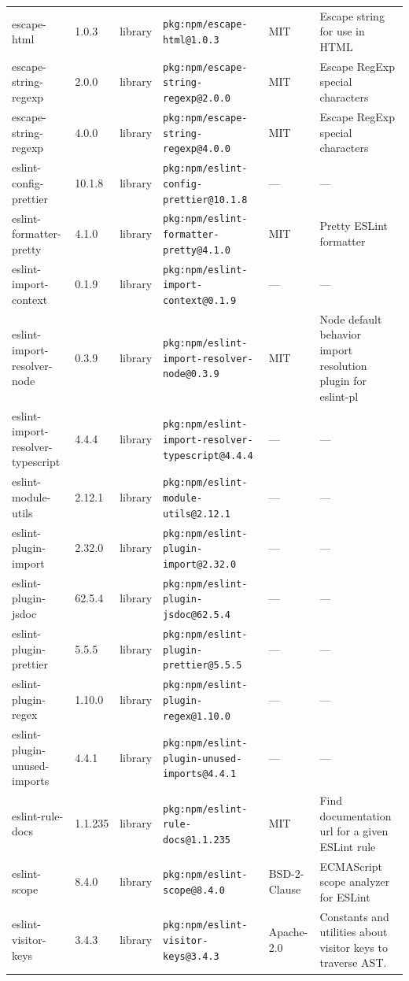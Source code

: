 \documentclass[11pt]{article}
\begin{document}
\begin{longtable}{|l|l|l|p{2.2cm}|l|p{4cm}|}
escape-html & 1.0.3 & library & \texttt{pkg:npm/escape-html@1.0.3} & MIT & Escape string for use in HTML \\
escape-string-regexp & 2.0.0 & library & \texttt{pkg:npm/escape-string-regexp@2.0.0} & MIT & Escape RegExp special characters \\
escape-string-regexp & 4.0.0 & library & \texttt{pkg:npm/escape-string-regexp@4.0.0} & MIT & Escape RegExp special characters \\
eslint-config-prettier & 10.1.8 & library & \texttt{pkg:npm/eslint-config-prettier@10.1.8} & — & — \\
eslint-formatter-pretty & 4.1.0 & library & \texttt{pkg:npm/eslint-formatter-pretty@4.1.0} & MIT & Pretty ESLint formatter \\
eslint-import-context & 0.1.9 & library & \texttt{pkg:npm/eslint-import-context@0.1.9} & — & — \\
eslint-import-resolver-node & 0.3.9 & library & \texttt{pkg:npm/eslint-import-resolver-node@0.3.9} & MIT & Node default behavior import resolution plugin for eslint-pl \\
eslint-import-resolver-typescript & 4.4.4 & library & \texttt{pkg:npm/eslint-import-resolver-typescript@4.4.4} & — & — \\
eslint-module-utils & 2.12.1 & library & \texttt{pkg:npm/eslint-module-utils@2.12.1} & — & — \\
eslint-plugin-import & 2.32.0 & library & \texttt{pkg:npm/eslint-plugin-import@2.32.0} & — & — \\
eslint-plugin-jsdoc & 62.5.4 & library & \texttt{pkg:npm/eslint-plugin-jsdoc@62.5.4} & — & — \\
eslint-plugin-prettier & 5.5.5 & library & \texttt{pkg:npm/eslint-plugin-prettier@5.5.5} & — & — \\
eslint-plugin-regex & 1.10.0 & library & \texttt{pkg:npm/eslint-plugin-regex@1.10.0} & — & — \\
eslint-plugin-unused-imports & 4.4.1 & library & \texttt{pkg:npm/eslint-plugin-unused-imports@4.4.1} & — & — \\
eslint-rule-docs & 1.1.235 & library & \texttt{pkg:npm/eslint-rule-docs@1.1.235} & MIT & Find documentation url for a given ESLint rule \\
eslint-scope & 8.4.0 & library & \texttt{pkg:npm/eslint-scope@8.4.0} & BSD-2-Clause & ECMAScript scope analyzer for ESLint \\
eslint-visitor-keys & 3.4.3 & library & \texttt{pkg:npm/eslint-visitor-keys@3.4.3} & Apache-2.0 & Constants and utilities about visitor keys to traverse AST. \\

\end{longtable}
\end{document}
